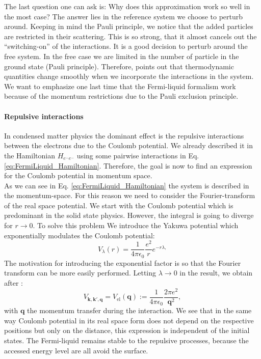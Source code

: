 \documentclass[../main.tex]{subfile}
\begin{document}
The last question one can ask is: Why does this approximation work so well in the most case? The answer lies in the reference system
we choose to perturb around. Keeping in mind the Pauli principle, we notice that the added particles are restricted in their scattering.
This is so strong, that it almost cancels out the ``switching-on'' of the interactions. It is a good decision to perturb around
the free system. In the free case we are limited in the number of particle in the ground state (Pauli principle).
Therefore, \cite{FossheimSudbo2004} points out that thermodynamic quantities change smoothly when we incorporate the interactions
in the system.\\

We want to emphasize one last time that the Fermi-liquid formalism work because of the momentum restrictions
due to the Pauli exclusion principle.


\paragraph{Repulsive interactions}$~$\\

In condensed matter physics the dominant effect is the repulsive interactions between the electrons due to the Coulomb potential.
 We already described it in the Hamiltonian 
$H_{e^-e^-}$ using some pairwise interactions in Eq. \ref{eq:FermiLiquid_Hamiltonian}. Therefore, the goal is now to
 find an expression for the Coulomb potential in momentum space.\\

As we can see in Eq. \ref{eq:FermiLiquid_Hamiltonian} the system is described in the momentum-space. For this reason we need to 
consider the Fourier-transform of the real space potential. We start with the Coulomb potential which is predominant in the solid state physics.
However, the integral is going to diverge for $r\rightarrow 0$. To solve this problem We
introduce the Yakuwa potential which exponentially modulates the Coulomb potential:
\begin{equation}
    V_{\lambda}(r) = \frac{1}{4\pi\epsilon_0} \frac{e^2}{r} e^{-r\lambda,} \label{eq:Yakuma}
\end{equation}
The motivation for introducing the exponential factor is so that the Fourier transform can be more easily performed.
Letting $\lambda\rightarrow 0$ in the result, we obtain after \cite{Cupcake}:
\begin{equation} \label{eq:Pot_repulsive_el}
    V_{\bm{k},\bm{k}',\bm{q}} = V_{\text{el}}(\bm{q}) := \frac{1}{4\pi\epsilon_0} \frac{2\pi e^2}{\bm{q}^2},
\end{equation}
with $\bm{q}$ the momentum transfer during the interaction. We see that in the same way Coulomb potential in its real
 space form does not depend on the respective positions but only on the distance,
this expression is independent of the initial states. 
The Fermi-liquid remains stable to the repulsive processes, because the accessed energy level are all avoid the surface.\\
\end{document}
